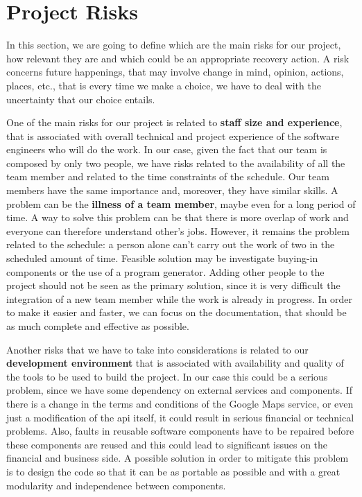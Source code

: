 \section{Project Risks} \label{sec:proj-risks}

In this section, we are going to define which are the main risks for our project, how relevant they are and which could be an appropriate recovery action.
A risk concerns future happenings, that may involve change in mind, opinion, actions, places, etc., that is every time we make a choice, we have to deal with the uncertainty that our choice entails.

One of the main risks for our project is related to \textbf{staff size and experience}, that is associated with overall technical and project experience of the software engineers who will do the work. In our case, given the fact that our team is composed by only two people, we have risks related to the availability of all the team member and related to the time constraints of the schedule.
Our team members have the same importance and, moreover, they have similar skills. A problem can be the \textbf{illness of a team member}, maybe even for a long period of time. A way to solve this problem can be that there is more overlap of work and everyone can therefore understand other's jobs. However, it remains the problem related to the schedule: a person alone can't carry out the work of two in the scheduled amount of time. Feasible solution may be investigate buying-in components or the use of a program generator. Adding other people to the project should not be seen as the primary solution, since it is very difficult the integration of a new team member while the work is already in progress. In order to make it easier and faster, we can focus on the documentation, that should be as much complete and effective as possible.

Another risks that we have to take into considerations is related to our \textbf{development environment} that is associated with availability and quality of the tools to be used to build the project. In our case this could be a serious problem, since we have some dependency on external services and components. If there is a change in the terms and conditions of the Google Maps service, or even just a modification of the \acs{api} itself, it could result in serious financial or technical problems. Also, faults in reusable software components have to be repaired before these components are reused and this could lead to significant issues on the financial and business side. A possible solution in order to mitigate this problem is to design the code so that it can be as portable as possible and with a great modularity and independence between components.


